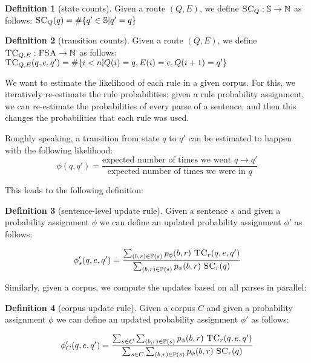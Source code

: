 \documentclass[12pt]{article}
\theoremstyle{definition}
\newtheorem{definition}{Definition}[section]
\begin{document}
\begin{definition}[state counts]
  Given a route $(Q,E)$, we define $\textsc{SC}_Q : \mathbb{S} \rightarrow\mathbb{N}$ as follows: $\textsc{SC}_Q(q) = \#\{ q'\in \mathbb{S} | q'=q \}$
\end{definition}


\begin{definition}[transition counts]
  Given a route $(Q,E)$, we define $\textsc{TC}_{Q,E} : \textsc{FSA} \rightarrow\mathbb{N}$ as follows: $\textsc{TC}_{Q,E}(q,e,q') = \#\{ i<n | Q(i)=q,E(i)=e,Q({i+1})=q'\}$
\end{definition}



We want to estimate the likelihood of each rule in a given corpus. For this, we iteratively re-estimate the rule probabilities: given a rule probability assignment, we can re-estimate the probabilities of every parse of a sentence, and then this changes the probabilities that each rule was used.

Roughly speaking, a transition from state $q$ to $q'$ can be estimated to happen with the following likelihood:
$$\phi(q,q') = \frac{\textrm{expected number of times we went }q\rightarrow q'}{\textrm{expected number of times we were in }q}$$

This leads to the following definition:

\begin{definition}[sentence-level update rule]
  Given a sentence $s$ and given a probability assignment $\phi$ we can define an updated probability assignment $\phi'$ as follows:

  $$\phi_s'(q,e,q') = \frac{\sum_{(b,r)\in\mathbb{P}(s)}p_\phi(b,r)~\textsc{TC}_r(q,e,q')}{\sum_{(b,r)\in\mathbb{P}(s)}p_\phi(b,r)~\textsc{SC}_r(q)}$$
\end{definition}

%




Similarly, given a corpus, we compute the updates based on all parses in parallel:
\begin{definition}[corpus update rule]
  Given a corpus $C$ and given a probability assignment $\phi$ we can define an updated probability assignment $\phi'$ as follows:

 $$\phi_C'(q,e,q') = \frac{\sum_{s\in C}\sum_{(b,r)\in\mathbb{P}(s)} p_\phi(b,r)~ \textsc{TC}_r(q,e,q')}{\sum_{s\in C}\sum_{(b,r)\in\mathbb{P}(s)} p_\phi(b,r)~ \textsc{SC}_r(q)}$$ 
\end{definition}
\end{document}
